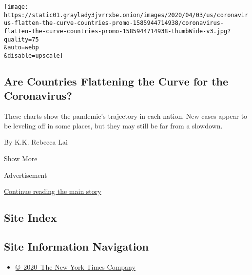 \begin{enumerate}
  \texttt{[image: https://static01.graylady3jvrrxbe.onion/images/2020/04/03/us/coronavirus-flatten-the-curve-countries-promo-1585944714938/coronavirus-flatten-the-curve-countries-promo-1585944714938-thumbWide-v3.jpg?quality=75\\\&auto=webp\\\&disable=upscale]}

  \hypertarget{are-countries-flattening-the-curve-for-the-coronavirus}{%
  \subsection{Are Countries Flattening the Curve for the
  Coronavirus?}\label{are-countries-flattening-the-curve-for-the-coronavirus}}

  These charts show the pandemic's trajectory in each nation. New cases
  appear to be leveling off in some places, but they may still be far
  from a slowdown.

  By K.K. Rebecca Lai
\end{enumerate}

Show More

Advertisement

\protect\hyperlink{after-mid2}{Continue reading the main story}

\hypertarget{site-index}{%
\subsection{Site Index}\label{site-index}}

\hypertarget{site-information-navigation}{%
\subsection{Site Information
Navigation}\label{site-information-navigation}}

\begin{itemize}
\tightlist
\item
  \href{https://help.nytimes3xbfgragh.onion/hc/en-us/articles/115014792127-Copyright-notice}{©~2020~The
  New York Times Company}
\end{itemize}


